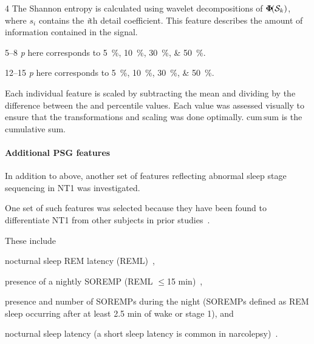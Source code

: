\begin{table}[t]
\begin{adjustwidth*}{}{}
\begin{threeparttable}
\begin{tabular}{@{}llc@{}}
        \bottomrule
    \end{tabular}
    \begin{tablenotes}
        \small
        \item[4] The Shannon entropy is calculated using wavelet decompositions of \( \boldsymbol{\Phi} \! \! \left( \mathcal{S}_{k} \right) \), where \(s_i\) contains the \textit{i}th detail coefficient. This feature describes the amount of information contained in the signal.
        \item[5--8] \textit{p} here corresponds to \SIlist{5;10;30;50}{\percent}. 
        \item[12--15] \textit{p} here corresponds to \SIlist{5;10;30;50}{\percent}. 
        \item Each individual feature is scaled by subtracting the mean and dividing by the difference between the  and  percentile values.
        Each value was assessed visually to ensure that the transformations and scaling was done optimally.
        \( \mathrm{cum \, sum} \) is the cumulative sum.
    \end{tablenotes}
\end{threeparttable}
\end{adjustwidth*}
\end{table}

\paragraph{Additional PSG features}
In addition to above, another set of features reflecting abnormal sleep stage sequencing in \ac{NT1} was investigated.

One set of such features was selected because they have been found to differentiate \ac{NT1} from other subjects in prior studies~\cite{Christensen2015a,Roth2013,Hansen2017,Drakatos2013,Liu2015b}. 

These include
\begin{enumerate*}[label=\arabic*)]
    \item nocturnal sleep REM latency (REML)~\cite{Andlauer2013},
    \item presence of a nightly SOREMP (REML $\leq$15 min)~\cite{Andlauer2013},
    \item presence and number of SOREMPs during the night (SOREMPs defined as REM sleep occurring after at least 2.5 min of wake or stage 1), and
    \item nocturnal sleep latency (a short sleep latency is common in narcolepsy)~\cite{Christensen2015a}.
\end{enumerate*}

